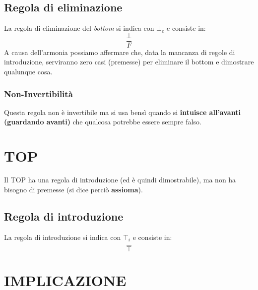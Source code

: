 \documentclass[12pt]{article}
\begin{document}
\subsection{Regola di eliminazione}
La regola di eliminazione del \textit{bottom} si indica con $\bot_e$ e consiste in:
\begin{equation}
    \dfrac{\bot}{F} \label{rule:bot_elim}
\end{equation}
A causa dell'armonia possiamo affermare che, data la mancanza di regole di introduzione, serviranno zero casi (premesse) per eliminare il bottom e dimostrare qualunque cosa.
\subsubsection{Non-Invertibilità}
Questa regola non è invertibile ma si usa bensì quando si \textbf{intuisce all'avanti (guardando avanti)} che qualcosa potrebbe essere sempre falso.
\section{TOP}
Il TOP ha una regola di introduzione (ed è quindi dimostrabile), ma non ha bisogno di premesse (si dice perciò \textbf{assioma}).
\subsection{Regola di introduzione}
La regola di introduzione si indica con $\top_i$ e consiste in:
\begin{equation}
    \dfrac{}{\top}  \label{rule:top_intro}
\end{equation}
\pagebreak
\section{IMPLICAZIONE}
\label{sec:imply}
\end{document}
